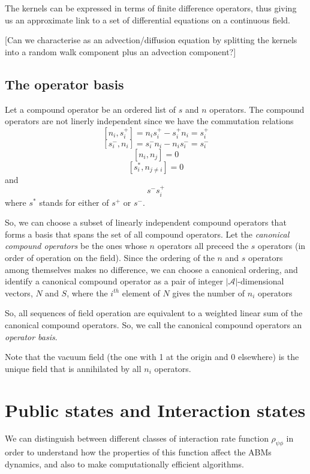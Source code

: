 \documentclass[a4paper]{article}
\begin{document}
The kernels can be expressed in terms of finite difference operators, thus giving us an approximate link to a set of differential equations on a continuous field.

[Can we characterise as an advection/diffusion equation by splitting the kernels into a random walk component plus an advection component?]


\subsection{The operator basis}

Let a compound operator be an ordered list of $s$ and $n$ operators. The compound operators are not linerly independent since we have the commutation relations
\[
[n_i,s^+_i] = n_i s^+_i - s^+_i n_i = s^+_i  
\]
\[
[s^-_i, n_i] = s^-_i n_i - n_i s^-_i = s^-_i  
\]
\[
[n_i, n_j] = 0
\]
\[
[s^*_i, n_{j \ne i}] = 0
\]
and
\[
s^-s^+_i
\]
where $s^*$ stands for either of $s^+$ or $s^-$.

So, we can choose a subset of linearly independent compound operators that forms a basis that spans the set of all compound operators. Let the \textit{canonical compound operators} be the ones whose $n$ operators all preceed the $s$ operators (in order of operation on the field). Since the ordering of the $n$ and $s$ operators among themselves makes no difference, we can choose a canonical ordering, and identify a canonical compound operator as a pair of integer $|\mathcal{A}|$-dimensional vectors, $N$ and $S$, where the $i^{th}$ element of $N$ gives the number of $n_i$ operators

So, all sequences of field operation are equivalent to  a weighted linear sum of the canonical compound operators. So, we call the canonical compound operators an \textit{operator basis}.

Note that the vacuum field (the one with 1 at the origin and 0 elsewhere) is the unique field that is annihilated by all $n_i$ operators.

\section{Public states and Interaction states}

We can distinguish between different classes of interaction rate function $\rho_{\psi\phi}$ in order to understand how the properties of this function affect the ABMs dynamics, and also to make computationally efficient algorithms.
\end{document}
